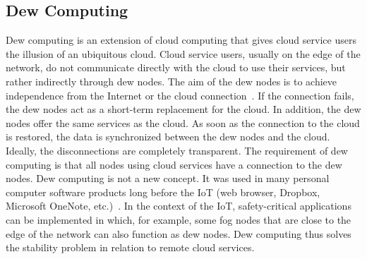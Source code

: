 \documentclass[english,version-2019-11]{uzl-thesis}
\begin{document}
\subsection{Dew Computing}
Dew computing is an extension of cloud computing that gives
cloud service users the illusion of an ubiquitous cloud.
Cloud service users, usually on the edge of the network,
do not communicate directly with the cloud to use their
services, but rather indirectly through dew nodes.
The aim of the dew nodes is to achieve independence from the
Internet or the cloud connection~\cite{DewComp}. If the connection fails,
the dew nodes act as a short-term replacement for the cloud.
In addition, the dew nodes offer the same services
as the cloud. As soon as the connection to the cloud
is restored, the data is synchronized between the dew
nodes and the cloud. Ideally, the disconnections are
completely transparent. The requirement of dew computing
is that all nodes using cloud services have a connection
to the dew nodes. Dew computing is not a new concept.
It was used in many personal computer software products long
before the IoT (web browser, Dropbox, Microsoft OneNote, etc.)~\cite{DefinitionDewComp}.
In the context
of the IoT, safety-critical applications can be implemented
in which, for example, some fog nodes that are close to the edge
of the network can also function as dew nodes. Dew computing thus
solves the stability problem in relation
to remote cloud services.
\end{document}
